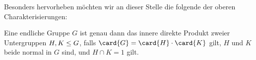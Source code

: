 Besonders hervorheben möchten wir an dieser Stelle die folgende der oberen Charakterisierungen:

\begin{corollary}
  Eine endliche Gruppe $G$ ist genau dann das innere direkte Produkt zweier Untergruppen $H, K \leq G$, falls $\card{G} = \card{H} \cdot \card{K}$ gilt, $H$ und $K$ beide normal in $G$ sind, und $H \cap K = 1$ gilt.
\end{corollary}

